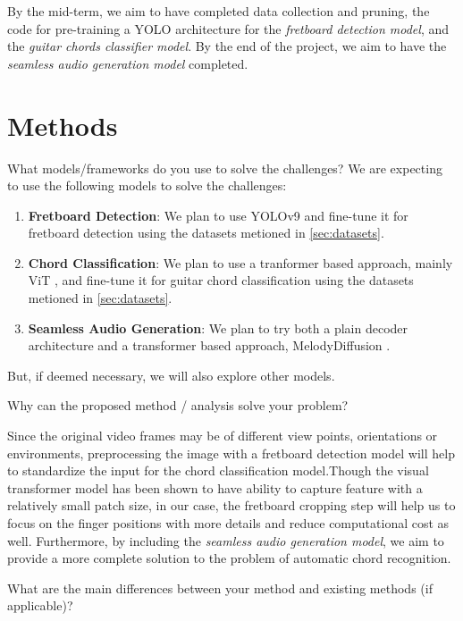 \documentclass[10pt,twocolumn,letterpaper]{article}
\begin{document}
By the mid-term, we aim to have completed data collection and pruning, the code for pre-training a YOLO architecture for the \emph{fretboard detection model}, and the \emph{guitar chords classifier model}. By the end of the project, we aim to have the \emph{seamless audio generation model} completed.

\section{Methods}\label{sec:methods}

What models/frameworks do you use to solve the challenges?
We are expecting to use the following models to solve the challenges:
\begin{enumerate}[label=\arabic*), itemsep=0.25pt]
    \item \textbf{Fretboard Detection}: We plan to use YOLOv9 \cite{wang2024yolov9} and fine-tune it for fretboard detection using the datasets metioned in \cref{sec:datasets}.
    \item \textbf{Chord Classification}: We plan to use a tranformer based approach, mainly ViT \cite{dosovitskiy2020image}, and fine-tune it for guitar chord classification using the datasets metioned in \cref{sec:datasets}.
    \item \textbf{Seamless Audio Generation}: We plan to try both a plain decoder architecture and a transformer based approach, MelodyDiffusion \cite{math11081915}.
\end{enumerate}

But, if deemed necessary, we will also explore other models.

Why can the proposed method / analysis solve your problem?

Since the original video frames may be of different view points, orientations or environments, preprocessing the image with a fretboard detection model will help to standardize the input for the chord classification model.Though the visual transformer model has been shown to have ability to capture feature with a relatively small patch size, in our case, the fretboard cropping step will help us to focus on the finger positions with more details and reduce computational cost as well.
Furthermore, by including the \emph{seamless audio generation model}, we aim to provide a more complete solution to the problem of automatic chord recognition.

What are the main differences between your method and existing methods (if applicable)?
\end{document}
